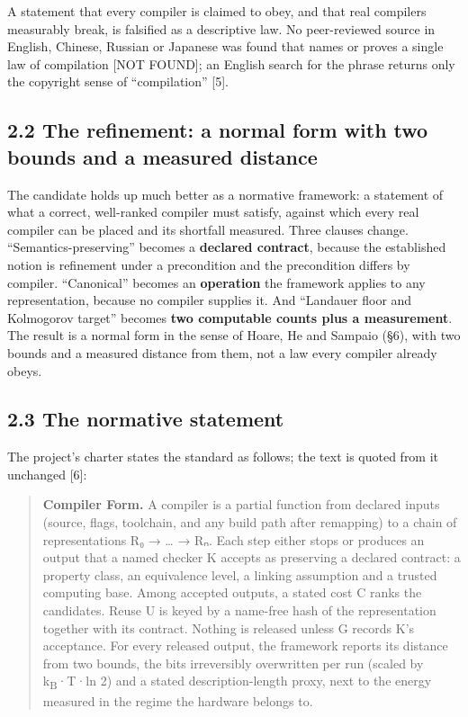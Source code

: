 \documentclass[10pt,letterpaper]{article}
\begin{document}
A statement that every compiler is claimed to obey, and that real
compilers measurably break, is falsified as a descriptive law. No
peer-reviewed source in English, Chinese, Russian or Japanese was found
that names or proves a single law of compilation {[}NOT FOUND{]}; an
English search for the phrase returns only the copyright sense of
``compilation'' {[}5{]}.

\subsection{2.2 The refinement: a normal form with two bounds and a
measured
distance}\label{the-refinement-a-normal-form-with-two-bounds-and-a-measured-distance}

The candidate holds up much better as a normative framework: a statement
of what a correct, well-ranked compiler must satisfy, against which
every real compiler can be placed and its shortfall measured. Three
clauses change. ``Semantics-preserving'' becomes a \textbf{declared
contract}, because the established notion is refinement under a
precondition and the precondition differs by compiler. ``Canonical''
becomes an \textbf{operation} the framework applies to any
representation, because no compiler supplies it. And ``Landauer floor
and Kolmogorov target'' becomes \textbf{two computable counts plus a
measurement}. The result is a normal form in the sense of Hoare, He and
Sampaio (§6), with two bounds and a measured distance from them, not a
law every compiler already obeys.

\subsection{2.3 The normative statement}\label{the-normative-statement}

The project's charter states the standard as follows; the text is quoted
from it unchanged {[}6{]}:

\begin{quote}
\textbf{Compiler Form.} A compiler is a partial function from declared
inputs (source, flags, toolchain, and any build path after remapping) to
a chain of representations R₀ → \ldots{} → Rₙ. Each step either stops or
produces an output that a named checker K accepts as preserving a
declared contract: a property class, an equivalence level, a linking
assumption and a trusted computing base. Among accepted outputs, a
stated cost C ranks the candidates. Reuse U is keyed by a name-free hash
of the representation together with its contract. Nothing is released
unless G records K's acceptance. For every released output, the
framework reports its distance from two bounds, the bits irreversibly
overwritten per run (scaled by k\textsubscript{B}·T·ln 2) and a stated
description-length proxy, next to the energy measured in the regime the
hardware belongs to.
\end{quote}
\end{document}
